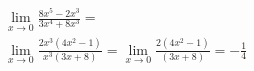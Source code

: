 \begin{ex}
\begin{align}
&\lim_{x\rightarrow 0} \frac{8x^5-2x^3}{3x^4+8x^3}=\nonumber\\
&\lim_{x\rightarrow 0} \frac{2x^3(4x^2-1)}{x^3(3x+8)}=\lim_{x\rightarrow 0} \frac{2(4x^2-1)}{(3x+8)}=-\frac{1}{4}\nonumber
\end{align}
\end{ex}